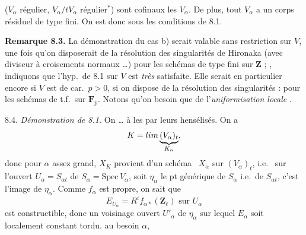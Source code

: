 \documentclass[11pt,a4paper]{article}
\begin{document}
($V_{\alpha}$ régulier,  $V_{\alpha}/tV_{\alpha}$ régulier$^{*}$) sont cofinaux  les $V_{\alpha}$. De plus, tout $V_{\alpha}$ a un corps résiduel de type fini. On est donc sous les conditions de 8.1.

\textbf{Remarque 8.3.}  La démonstration du cas b) \struck{\ill{}} serait valable sans restriction sur $V$, une fois qu'on disposerait de la résolution des singularités  de Hironaka \struck{\ill{}} (avec diviseur à croisements normaux …) pour les schémas de type fini sur $\mathbf{Z}$ ;   , indiquons que \struck{\ill{}} l'hyp.\ de 8.1 sur $V$ est \emph{très} satisfaite. Elle serait en particulier encore \ill{} \ill{} si $V$ est de car.\ $p > 0$, si on dispose de la résolution des singularités : pour les schémas de t.f.\ sur $\mathbf{F}_{p}$. Notons qu'on   besoin  \struck{\ill{}} \struck{\ill{}} que de \og l'\emph{uniformisation locale} \fg.

8.4. \emph{Démonstration de 8.1.} On \struck{\ill{}}  …  à les  par leurs hensélisés. On a
\[ K = \varinjlim \underbrace{(V_{\alpha})_{t}}_{K_{\alpha}} , \]
donc pour $\alpha$ assez grand, $X_{K}$ provient d'un \struck{\ill{}} \struck{\ill{}} schéma \struck{\ill{}} \ $X_{\alpha}$ sur   $(V_{\alpha})_{t}$, i.e.\ \struck{\ill{}} sur l'ouvert $U_{\alpha} = S_{\alpha t}$ de $S_{\alpha} = \mathrm{Spec}\, V_{\alpha}$, \struck{\ill{}} soit $\eta_{\alpha}$ le pt générique de $S_{\alpha}$ i.e.\ de $S_{\alpha t}$, c'est l'image de $\eta_{\alpha}$.   Comme $f_{\alpha}$ est propre, on sait  que
\[ E_{U_{\alpha}} = R^{i} f_{\alpha *}(\mathbf{Z}_{\ell}) \text{ sur } U_{\alpha} \]
est constructible, donc \struck{\ill{}}  un voisinage ouvert $U'_{\alpha}$ de $\eta_{\alpha}$ sur lequel $E_{\alpha}$ soit localement constant tordu.  au besoin $\alpha$, 

\end{document}
